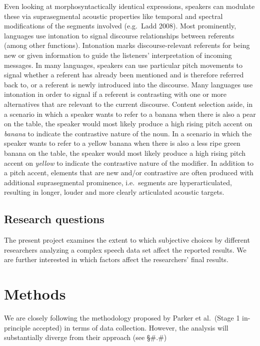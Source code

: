 \documentclass[
  english,
  man]{apa6}
\begin{document}
Even looking at morphosyntactically identical expressions, speakers can modulate these via suprasegmental acoustic properties like temporal and spectral modifications of the segments involved (e.g.~Ladd 2008).
Most prominently, languages use intonation to signal discourse relationships between referents (among other functions).
Intonation marks discourse-relevant referents for being new or given information to guide the listeners' interpretation of incoming messages.
In many languages, speakers can use particular pitch movements to signal whether a referent has already been mentioned and is therefore referred back to, or a referent is newly introduced into the discourse.
Many languages use intonation in order to signal if a referent is contrasting with one or more alternatives that are relevant to the current discourse.
Content selection aside, in a scenario in which a speaker wants to refer to a banana when there is also a pear on the table, the speaker would most likely produce a high rising pitch accent on \emph{banana} to indicate the contrastive nature of the noun.
In a scenario in which the speaker wants to refer to a yellow banana when there is also a less ripe green banana on the table, the speaker would most likely produce a high rising pitch accent on \emph{yellow} to indicate the contrastive nature of the modifier.
In addition to a pitch accent, elements that are new and/or contrastive are often produced with additional suprasegmental prominence, i.e.~segments are hyperarticulated, resulting in longer, louder and more clearly articulated acoustic targets.

\hypertarget{research-questions}{%
\subsection{Research questions}\label{research-questions}}

The present project examines the extent to which subjective choices by different researchers analyzing a complex speech data set affect the reported results.
We are further interested in which factors affect the researchers' final results.

\hypertarget{methods}{%
\section{Methods}\label{methods}}

We are closely following the methodology proposed by Parker et al.~(Stage 1 in-principle accepted) in terms of data collection.
However, the analysis will substantially diverge from their approach (see §\#.\#)
\end{document}
